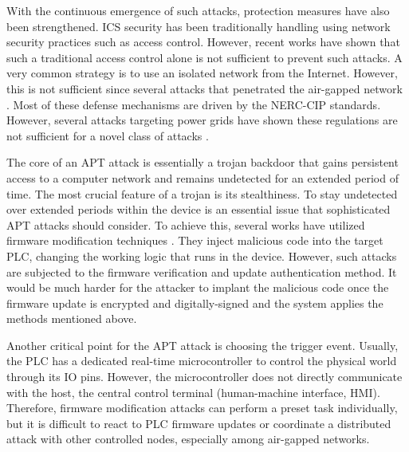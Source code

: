 
With the continuous emergence of such attacks, protection measures have also been strengthened. ICS security has been traditionally handling using network security practices such as access control. However, recent works have shown that such a traditional access control alone is not sufficient to prevent such attacks\cite{etigowni2016cpac}. A very common strategy is to use an isolated network from the Internet. However, this is not sufficient since several attacks that penetrated the air-gapped network \cite{cherepanov2016blackenergy, langner2011stuxnet, di2018triton}. Most of these defense mechanisms are driven by the NERC-CIP standards. However, several attacks targeting power grids have shown these regulations are not sufficient for a novel class of attacks \cite{huang2018algorithmic,garcia2017hey}.  


The core of an APT attack is essentially a trojan backdoor that gains persistent access to a computer network and remains undetected for an extended period of time. The most crucial feature of a trojan is its stealthiness. To stay undetected over extended periods within the device is an essential issue that sophisticated APT attacks should consider. To achieve this, several works have utilized firmware modification techniques \cite{garcia2017hey, newman2011scada, basnight2013firmware, blanco2012one, cui2013firmware, konstantinou2015impact, schulz2017nexmon}. They inject malicious code into the target PLC, changing the working logic that runs in the device. However, such attacks are subjected to the firmware verification \cite{mcminn2012firmware, wang2015confirm, lee2016binding, li2011viper, seshadri2004swatt, li2010sbap} and update authentication \cite{lee2017blockchain, moran2019firmware, choi2016secure} method. It would be much harder for the attacker to implant the malicious code once the firmware update is encrypted and digitally-signed and the system applies the methods mentioned above.

Another critical point for the APT attack is choosing the trigger event. Usually, the PLC has a dedicated real-time microcontroller to control the physical world through its IO pins. However, the microcontroller does not directly communicate with the host, the central control terminal (human-machine interface, HMI). Therefore, firmware modification attacks can perform a preset task individually, but it is difficult to react to PLC firmware updates or coordinate a distributed attack with other controlled nodes, especially among air-gapped networks.

